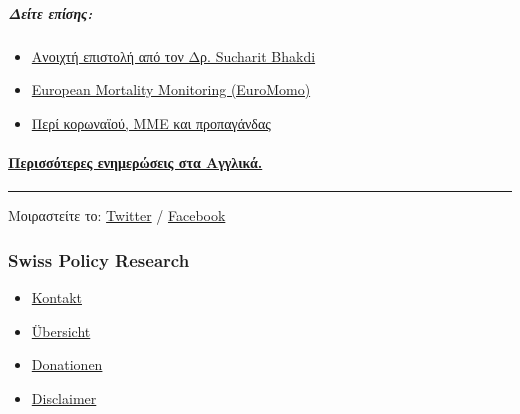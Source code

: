 \hypertarget{ux3b4ux3b5ux3afux3c4ux3b5-ux3b5ux3c0ux3afux3c3ux3b7ux3c2}{%
\subparagraph{\texorpdfstring{\textbf{Δείτε
επίσης:}}{Δείτε επίσης:}}\label{ux3b4ux3b5ux3afux3c4ux3b5-ux3b5ux3c0ux3afux3c3ux3b7ux3c2}}

\begin{itemize}
\tightlist
\item
  \href{https://swprs.org/professor-bhakdi-open-letter-greek/}{Ανοιχτή
  επιστολή από τον Δρ. Sucharit Bhakdi}
\item
  \href{https://www.euromomo.eu/}{European Mortality Monitoring
  (EuroMomo)}
\item
  \href{https://swprs.org/corona-media-propaganda-greek/}{Περί
  κορωναϊού, ΜΜΕ και προπαγάνδας}
\end{itemize}

\hypertarget{ux3c0ux3b5ux3c1ux3b9ux3c3ux3c3ux3ccux3c4ux3b5ux3c1ux3b5ux3c2-ux3b5ux3bdux3b7ux3bcux3b5ux3c1ux3ceux3c3ux3b5ux3b9ux3c2-ux3c3ux3c4ux3b1-ux3b1ux3b3ux3b3ux3bbux3b9ux3baux3ac}{%
\paragraph{\texorpdfstring{\href{https://swprs.org/a-swiss-doctor-on-covid-19/}{Περισσότερες
ενημερώσεις στα
Αγγλικά.}}{Περισσότερες ενημερώσεις στα Αγγλικά.}}\label{ux3c0ux3b5ux3c1ux3b9ux3c3ux3c3ux3ccux3c4ux3b5ux3c1ux3b5ux3c2-ux3b5ux3bdux3b7ux3bcux3b5ux3c1ux3ceux3c3ux3b5ux3b9ux3c2-ux3c3ux3c4ux3b1-ux3b1ux3b3ux3b3ux3bbux3b9ux3baux3ac}}

\begin{center}\rule{0.5\linewidth}{\linethickness}\end{center}

Μοιραστείτε το:
\href{https://twitter.com/intent/tweet?url=https://swprs.org/facts-about-covid19-greek/}{Twitter}
/
\href{https://www.facebook.com/share.php?u=https://swprs.org/facts-about-covid19-greek/}{Facebook}

\hypertarget{swiss-policy-research}{%
\subsubsection{Swiss Policy Research}\label{swiss-policy-research}}

\begin{itemize}
\tightlist
\item
  \href{https://swprs.org/kontakt/}{Kontakt}
\item
  \href{https://swprs.org/uebersicht/}{Übersicht}
\item
  \href{https://swprs.org/donationen/}{Donationen}
\item
  \href{https://swprs.org/disclaimer/}{Disclaimer}
\end{itemize}

